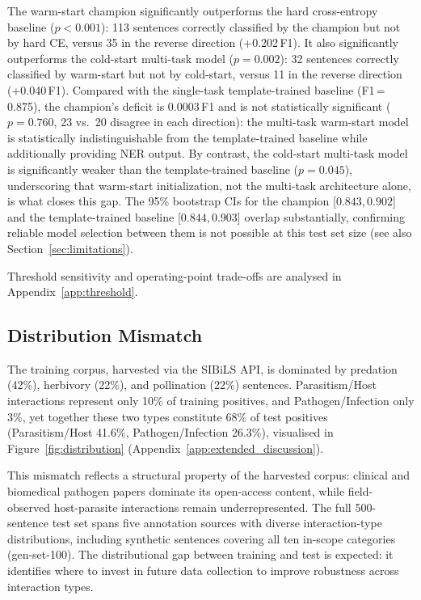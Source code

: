 \documentclass[11pt]{article}
\begin{document}
The warm-start champion significantly outperforms the hard cross-entropy
baseline ($p{<}0.001$): 113 sentences correctly classified by the champion
but not by hard CE, versus 35 in the reverse direction (+0.202\,F1).
It also significantly outperforms the cold-start multi-task model
($p{=}0.002$): 32 sentences correctly classified by warm-start
but not by cold-start, versus 11 in the reverse direction (+0.040\,F1).
Compared with the single-task template-trained baseline (F1\,=\,0.875),
the champion's deficit is 0.0003\,F1 and is not statistically significant
($p = 0.760$, 23 vs.\ 20 disagree in each direction): the multi-task warm-start model
is statistically indistinguishable from the template-trained baseline while
additionally providing NER output. By contrast, the cold-start multi-task
model is significantly weaker than the template-trained baseline
($p{=}0.045$), underscoring that warm-start initialization, not the
multi-task architecture alone, is what closes this gap.
The 95\% bootstrap CIs for the champion [$0.843, 0.902$] and the
template-trained baseline [$0.844, 0.903$] overlap substantially, confirming
reliable model selection between them is not possible at this test set size
(see also Section~\ref{sec:limitations}).

Threshold sensitivity and operating-point trade-offs are analysed in
Appendix~\ref{app:threshold}.

\subsection{Distribution Mismatch}

The training corpus, harvested via the SIBiLS API,
is dominated by predation (42\%), herbivory (22\%), and pollination (22\%)
sentences.
Parasitism/Host interactions represent only 10\% of training positives, and
Pathogen/Infection only 3\%, yet together these two types constitute 68\%
of test positives (Parasitism/Host 41.6\%, Pathogen/Infection 26.3\%),
visualised in Figure~\ref{fig:distribution} (Appendix~\ref{app:extended_discussion}).

This mismatch reflects a structural property of the harvested corpus:
clinical and biomedical pathogen papers dominate its open-access content,
while field-observed host-parasite interactions remain underrepresented.
The full 500-sentence test set spans five annotation sources
with diverse interaction-type distributions, including synthetic sentences
covering all ten in-scope categories (gen-set-100). The distributional gap
between training and test is expected: it identifies where to invest in
future data collection to improve robustness across interaction types.
\end{document}
